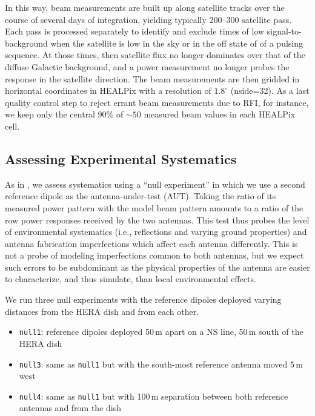 \documentclass{emulateapj}
\begin{document}
In this way, beam measurements are built up along satellite tracks over the course of 
several days of integration, yielding typically 200--300 satellite pass. Each pass is 
processed separately to identify and exclude times of low signal-to-background when the 
satellite is low in the sky or in the off state of of a pulsing sequence. At those times, then 
satellite flux no longer dominates over that of the diffuse Galactic background, and a 
power measurement no longer probes the response in the satellite direction. The beam 
measurements are then gridded in horizontal coordinates in HEALPix with a resolution of 
$1.8^\circ$ (nside=32). As a last quality control step to reject errant beam measurements 
due to RFI, for instance, we keep only the central 90\% of $\sim50$ measured beam 
values in each HEALPix cell.


\subsection{Assessing Experimental Systematics}

As in \citet{neben15}, we assess systematics using a ``null experiment'' in which we use a second reference dipole as the antenna-under-test (AUT). Taking the ratio of its measured power pattern with the model beam pattern amounts to a ratio of the row power responses received by the two antennas. This test thus probes the level of environmental systematics (i.e., reflections and varying ground properties) and antenna fabrication imperfections which affect each antenna differently. This is not a probe of modeling imperfections common to both antennas, but we expect such errors to be subdominant as the physical properties of the antenna are easier to characterize, and thus simulate, than local environmental effects. 

We run three null experiments with the reference dipoles deployed varying distances from the HERA dish and from each other.

\begin{itemize}
\item \texttt{null1}: reference dipoles deployed 50\,m apart on a NS line, 50\,m south of the HERA dish
\item \texttt{null3}: same as \texttt{null1} but with the south-most reference antenna moved 5\,m west
\item \texttt{null4}: same as \texttt{null1} but with 100\,m separation between both reference antennas and from the dish
\end{itemize}
\end{document}

